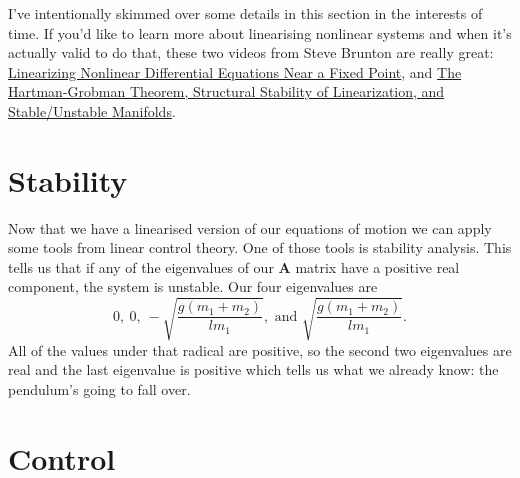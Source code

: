 \documentclass{article}
\renewcommand{\vec}[1]{\boldsymbol{\mathbf{#1}}}
\begin{document}
I've intentionally skimmed over some details in this section in the interests of time. If you'd like to learn more about linearising nonlinear systems and when it's actually valid to do that, these two videos from Steve Brunton are really great: \href{https://www.youtube.com/watch?v=RCWkzzLgwf0}{Linearizing Nonlinear Differential Equations Near a Fixed Point}, and \href{https://www.youtube.com/watch?v=vRaUSnB7qNw}{The Hartman-Grobman Theorem, Structural Stability of Linearization, and Stable/Unstable Manifolds}.

\section{Stability}

Now that we have a linearised version of our equations of motion we can apply some tools from linear control theory. One of those tools is stability analysis. This tells us that if any of the eigenvalues of our $\vec{A}$ matrix have a positive real component, the system is unstable. Our four eigenvalues are \[0, \ 0, \ -\sqrt{\frac{g (m_1 + m_2)}{l m_1}}, \text{ and } \sqrt{\frac{g (m_1 + m_2)}{l m_1}}.\] All of the values under that radical are positive, so the second two eigenvalues are real and the last eigenvalue is positive which tells us what we already know: the pendulum's going to fall over.

\section{Control}
\end{document}
